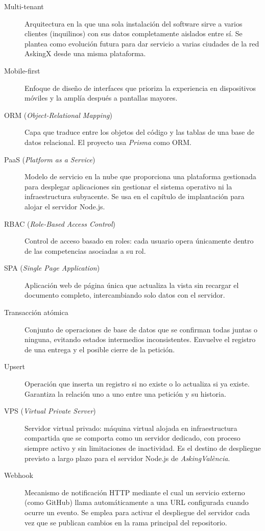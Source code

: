 \documentclass[11pt,oneside,spanish,listoffigures,listoftables]{tfgetsinf}
\begin{document}
\begin{description}
  \item[Multi-tenant] Arquitectura en la que una sola instalación del software sirve a varios clientes (inquilinos) con sus datos completamente aislados entre sí. Se plantea como evolución futura para dar servicio a varias ciudades de la red AskingX desde una misma plataforma.
  \item[Mobile-first] Enfoque de diseño de interfaces que prioriza la experiencia en dispositivos móviles y la amplía después a pantallas mayores.
  \item[ORM (\textit{Object-Relational Mapping})] Capa que traduce entre los objetos del código y las tablas de una base de datos relacional. El proyecto usa \textit{Prisma} como ORM.
  \item[PaaS (\textit{Platform as a Service})] Modelo de servicio en la nube que proporciona una plataforma gestionada para desplegar aplicaciones sin gestionar el sistema operativo ni la infraestructura subyacente. Se usa en el capítulo de implantación para alojar el servidor Node.js.
  \item[RBAC (\textit{Role-Based Access Control})] Control de acceso basado en roles: cada usuario opera únicamente dentro de las competencias asociadas a su rol.
  \item[SPA (\textit{Single Page Application})] Aplicación web de página única que actualiza la vista sin recargar el documento completo, intercambiando solo datos con el servidor.
  \item[Transacción atómica] Conjunto de operaciones de base de datos que se confirman todas juntas o ninguna, evitando estados intermedios inconsistentes. Envuelve el registro de una entrega y el posible cierre de la petición.
  \item[Upsert] Operación que inserta un registro si no existe o lo actualiza si ya existe. Garantiza la relación uno a uno entre una petición y su historia.
  \item[VPS (\textit{Virtual Private Server})] Servidor virtual privado: máquina virtual alojada en infraestructura compartida que se comporta como un servidor dedicado, con proceso siempre activo y sin limitaciones de inactividad. Es el destino de despliegue previsto a largo plazo para el servidor Node.js de \textit{AskingValència}.
  \item[Webhook] Mecanismo de notificación HTTP mediante el cual un servicio externo (como GitHub) llama automáticamente a una URL configurada cuando ocurre un evento. Se emplea para activar el despliegue del servidor cada vez que se publican cambios en la rama principal del repositorio.
\end{description}
\end{document}
